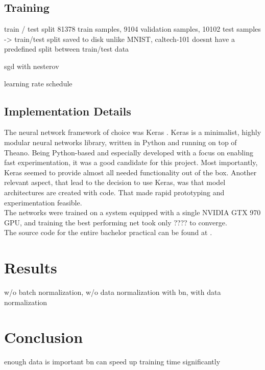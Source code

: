 \documentclass[a4paper, 11pt]{article}
\begin{document}
\subsection{Training}
train / test split
81378 train samples, 9104 validation samples, 10102 test samples -> train/test split saved to disk
unlike MNIST, caltech-101 doesnt have a predefined split between train/test data

sgd with nesterov

learning rate schedule

\subsection{Implementation Details}
The neural network framework of choice was Keras \cite{keras}.
Keras is a minimalist, highly modular neural networks library, written in Python and running on top of Theano.
Being Python-based and especially developed with a focus on enabling fast experimentation, it was a good candidate for this project.
Most importantly, Keras seemed to provide almost all needed functionality out of the box.
Another relevant aspect, that lead to the decision to use Keras, was that model architectures are created with code.
That made rapid prototyping and experimentation feasible.\\

The networks were trained on a system equipped with a single NVIDIA GTX 970 GPU, and training the best performing net took only ???? to converge.\\

The source code for the entire bachelor practical can be found at \cite{UnternaehrerCode}.

\section{Results}
w/o batch normalization, w/o data normalization
with bn, with data normalization


\section{Conclusion}
enough data is important
bn can speed up training time significantly





\end{document}
